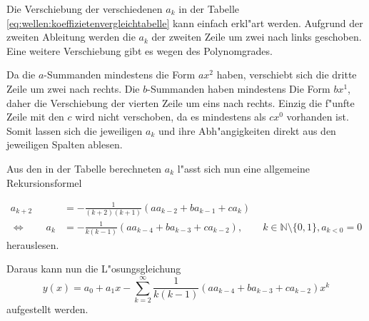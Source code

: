 Die Verschiebung der verschiedenen $a_k$ in der Tabelle 
\ref{eq:wellen:koeffizietenvergleichtabelle} kann einfach erkl"art werden. 
Aufgrund der zweiten Ableitung werden die $a_k$ der zweiten Zeile um zwei nach 
links geschoben. Eine weitere Verschiebung gibt es wegen des Polynomgrades.

Da die $a$-Summanden mindestens die Form $ax^2$ haben, verschiebt sich die 
dritte Zeile um zwei nach rechts. Die $b$-Summanden haben mindestens Die Form 
$bx^1$, daher die Verschiebung der vierten Zeile um eins nach rechts. Einzig 
die f"unfte Zeile mit den $c$ wird nicht verschoben, da es mindestens als 
$cx^0$ vorhanden ist. Somit lassen sich die jeweiligen $a_k$ und ihre 
Abh"angigkeiten direkt aus den jeweiligen Spalten ablesen.

Aus den in der Tabelle berechneten $a_k$ l"asst sich nun eine allgemeine 
Rekursionsformel

\begin{equation*}
	\begin{split}
		a_{k+2} &= -\frac{1}{(k+2)(k+1)} (aa_{k-2}+ba_{k-1}+ca_k) \\
		\Leftrightarrow \qquad
		a_k &= -\frac{1}{k(k-1)} (aa_{k-4}+ba_{k-3}+ca_{k-2}), \qquad k \in 
		\mathbb{N} \setminus \{0, 1\}, a_{k<0} = 0
	\end{split}
\end{equation*}
herauslesen. 

Daraus kann nun die L"osungsgleichung
\begin{equation}
	y(x) = a_0 + a_1x 
	-\sum_{k=2}^{\infty}\frac{1}{k(k-1)}(aa_{k-4}+ba_{k-3}+ca_{k-2})x^k
	\label{eq:wellen:ygleichung}
\end{equation}
aufgestellt werden.